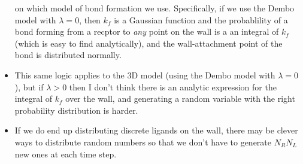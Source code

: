 \documentclass{article}
\begin{document}
\begin{itemize}
  on which model of bond formation we use. Specifically, if we use the
  Dembo model with $\lambda = 0$, then $k_f$ is a Gaussian function
  and the probablility of a bond forming from a recptor to \emph{any}
  point on the wall is a an integral of $k_f$ (which is easy to find
  analytically), and the wall-attachment point of the bond is
  distributed normally.
\item This same logic applies to the 3D model (using the Dembo model
  with $\lambda = 0$), but if $\lambda > 0$ then I don't think there
  is an analytic expression for the integral of $k_f$ over the wall,
  and generating a random variable with the right probability
  distribution is harder.
\item If we do end up distributing discrete ligands on the wall, there
  may be clever ways to distribute random numbers so that we don't
  have to generate $N_R N_L$ new ones at each time step.
\end{itemize}



\end{document}
